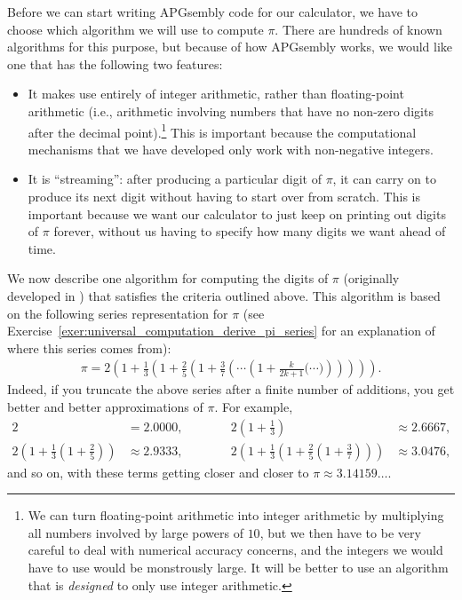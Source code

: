 Before we can start writing APGsembly code for our calculator, we have to choose which algorithm we will use to compute $\pi$. There are hundreds of known algorithms for this purpose, but because of how APGsembly works, we would like one that has the following two features:\smallskip

\begin{itemize}
	\item It makes use entirely of integer arithmetic, rather than floating-point arithmetic (i.e., arithmetic involving numbers that have no non-zero digits after the decimal point).\footnote{We can turn floating-point arithmetic into integer arithmetic by multiplying all numbers involved by large powers of $10$, but we then have to be very careful to deal with numerical accuracy concerns, and the integers we would have to use would be monstrously large. It will be better to use an algorithm that is \emph{designed} to only use integer arithmetic.} This is important because the computational mechanisms that we have developed only work with non-negative integers.\smallskip
	
	\item It is ``streaming'': after producing a particular digit of $\pi$, it can carry on to produce its next digit without having to start over from scratch. This is important because we want our calculator to just keep on printing out digits of $\pi$ forever, without us having to specify how many digits we want ahead of time.\smallskip
\end{itemize}

We now describe one algorithm for computing the digits of $\pi$ (originally developed in \cite{Gib06}) that satisfies the criteria outlined above. This algorithm is based on the following series representation for $\pi$ (see Exercise~\ref{exer:universal_computation_derive_pi_series} for an explanation of where this series comes from):
\begin{align}\label{eq:pi_series}
	\pi = 2\left(1 + \frac{1}{3}\left( 1 + \frac{2}{5}\left( 1 + \frac{3}{7}\left( \cdots \left( 1 + \frac{k}{2k+1}\Big( \cdots \Big) \right)\right)\right)\right)\right).
\end{align}
Indeed, if you truncate the above series after a finite number of additions, you get better and better approximations of $\pi$. For example,
\begin{equation}\label{eq:pi_approx}
\begin{alignedat}{2}
2 & = 2.0000, \qquad \quad {} & 2\left(1 + \frac{1}{3}\right) & \approx 2.6667, \\
2\left(1 + \frac{1}{3}\left(1 + \frac{2}{5}\right)\right) & \approx 2.9333, \qquad \quad {} & 2\left(1 + \frac{1}{3}\left(1 + \frac{2}{5}\left(1 + \frac{3}{7}\right)\right)\right) & \approx 3.0476,
\end{alignedat}
\end{equation}
and so on, with these terms getting closer and closer to $\pi \approx 3.14159\ldots$.

